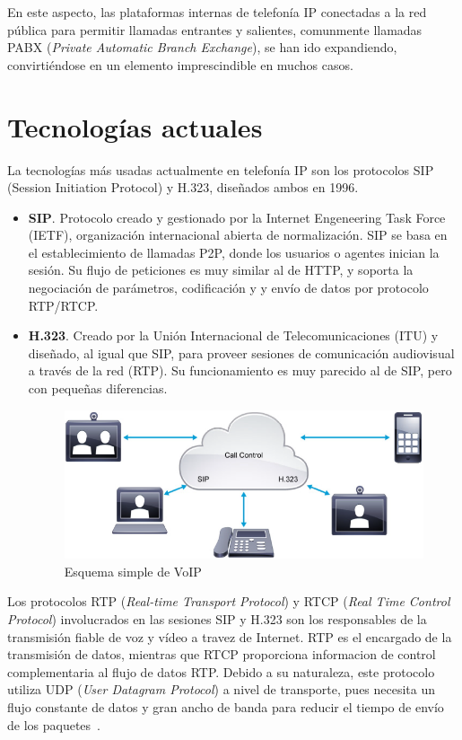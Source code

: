 \documentclass[a4paper, 12pt]{book}
\begin{document}
En este aspecto, las plataformas internas de telefonía IP conectadas a la red pública para permitir llamadas entrantes y salientes, comunmente llamadas PABX (\emph{Private Automatic Branch Exchange}), se han ido expandiendo, convirtiéndose en un elemento imprescindible en muchos casos. 

\section{Tecnologías actuales}
\label{sec:tecnologias-actuales}

La tecnologías más usadas actualmente en telefonía IP son los protocolos SIP (Session Initiation Protocol) y H.323, diseñados ambos en 1996.
\begin{itemize}
  \item  \textbf{SIP}. Protocolo creado y gestionado por la Internet Engeneering Task Force (IETF), organización internacional abierta de normalización. SIP se basa en el establecimiento de llamadas P2P, donde los usuarios o agentes inician la sesión. Su flujo de peticiones es muy similar al de HTTP, y soporta la negociación de parámetros, codificación y y envío de datos por protocolo RTP/RTCP.
  \item \textbf{H.323}. Creado por la Unión Internacional de Telecomunicaciones (ITU) y diseñado, al igual que SIP, para proveer sesiones de comunicación audiovisual a través de la red (RTP). Su funcionamiento es muy parecido al de SIP, pero con pequeñas diferencias.
  \\
  \begin{figure}[h]
    \centering
    \includegraphics{img/fig_diagrama_simple_collab}
    \caption{Esquema simple de VoIP}
    \label{figura:fig_diagrama_simple_collab}
  \end{figure}
\end{itemize}

Los protocolos RTP (\emph{Real-time Transport Protocol}) y RTCP (\emph{Real Time Control Protocol}) involucrados en las sesiones SIP y H.323 son los responsables de la transmisión fiable de voz y vídeo a travez de Internet. RTP es el encargado de la transmisión de datos, mientras que RTCP proporciona informacion de control complementaria al flujo de datos RTP. Debido a su naturaleza, este protocolo utiliza UDP (\emph{User Datagram Protocol}) a nivel de transporte, pues necesita un flujo constante de datos y gran ancho de banda para reducir el tiempo de envío de los paquetes~\cite{cisco:_video}.
\end{document}
